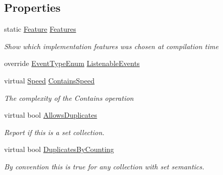 \subsection*{Properties}
\begin{DoxyCompactItemize}
\item 
static \hyperlink{_hash_table_8cs_a3ba53141e4e2a9f89bcfc8cf229955f7}{Feature} \hyperlink{class_c5_1_1_hash_set_af105c294816c484c8e48544daa7c0b32}{Features}
\begin{DoxyCompactList}\small\item\em Show which implementation features was chosen at compilation time \end{DoxyCompactList}\item 
override \hyperlink{namespace_c5_a9143bfd561fffa025d21561674758008}{Event\+Type\+Enum} \hyperlink{class_c5_1_1_hash_set_a55a5a5a8a33bd7058881493bc3d3ae6a}{Listenable\+Events}
\item 
virtual \hyperlink{namespace_c5_a615ba88dcdaa8d5a3c5f833a73d7fad6}{Speed} \hyperlink{class_c5_1_1_hash_set_a206298276b5ddfbb9a528df96a5620ae}{Contains\+Speed}
\begin{DoxyCompactList}\small\item\em The complexity of the Contains operation \end{DoxyCompactList}\item 
virtual bool \hyperlink{class_c5_1_1_hash_set_a95849b8404288074ea8622d77ccb1142}{Allows\+Duplicates}
\begin{DoxyCompactList}\small\item\em Report if this is a set collection. \end{DoxyCompactList}\item 
virtual bool \hyperlink{class_c5_1_1_hash_set_ae9ad56098db41bbbd2a0baabef06bc14}{Duplicates\+By\+Counting}
\begin{DoxyCompactList}\small\item\em By convention this is true for any collection with set semantics. \end{DoxyCompactList}\end{DoxyCompactItemize}
